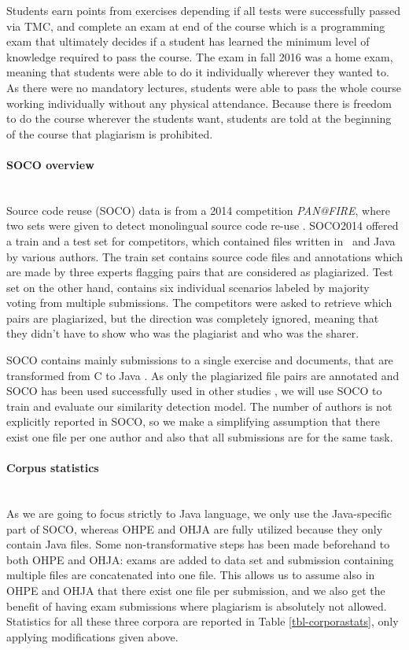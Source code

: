 Students earn points from exercises depending if all tests were successfully passed via TMC, and complete an exam at end of the course which is a programming exam that ultimately decides if a student has learned the minimum level of knowledge required to pass the course. The exam in fall 2016 was a home exam, meaning that students were able to do it individually wherever they wanted to. As there were no mandatory lectures, students were able to pass the whole course working individually without any physical attendance. Because there is freedom to do the course wherever the students want, students are told at the beginning of the course that plagiarism is prohibited.

\paragraph{SOCO overview}\mbox{}\\
Source code reuse (SOCO) data is from a 2014 competition \emph{PAN@FIRE}, where two sets were given to detect monolingual source code re-use \cite{saez2014pan}. SOCO2014 offered a train and a test set for competitors, which contained files written in \cpp\, and Java by various authors. The train set contains source code files and annotations which are made by three experts flagging pairs that are considered as plagiarized. Test set on the other hand, contains six individual scenarios labeled by majority voting from multiple submissions. The competitors were asked to retrieve which pairs are plagiarized, but the direction was completely ignored, meaning that they didn't have to show who was the plagiarist and who was the sharer.  

SOCO contains mainly submissions to a single exercise and documents, that are transformed from C to Java \cite{saez2014pan}. As only the plagiarized file pairs are annotated and SOCO has been used successfully used in other studies \cite{AIR2015, RCISCP2017, OTIOLSS2015, USCR2014}, we
will use SOCO to train and evaluate our similarity detection model. The number of authors is not explicitly reported in SOCO, so we make a simplifying assumption that there exist one file per one author and also that all submissions are for the same task. 



\paragraph{Corpus statistics}\mbox{}\\
As we are going to focus strictly to Java language, we only use the Java-specific part of SOCO, whereas OHPE and OHJA are fully utilized because they only contain Java files. Some non-transformative steps has been made beforehand to both OHPE and OHJA: exams are added to data set and submission containing multiple files are concatenated into one file. This allows us to assume also in OHPE and OHJA that there exist one file per submission, and we also get the benefit of having exam submissions where plagiarism is absolutely not allowed. Statistics for all these three corpora are reported in Table \ref{tbl-corporastats}, only applying modifications given above.

